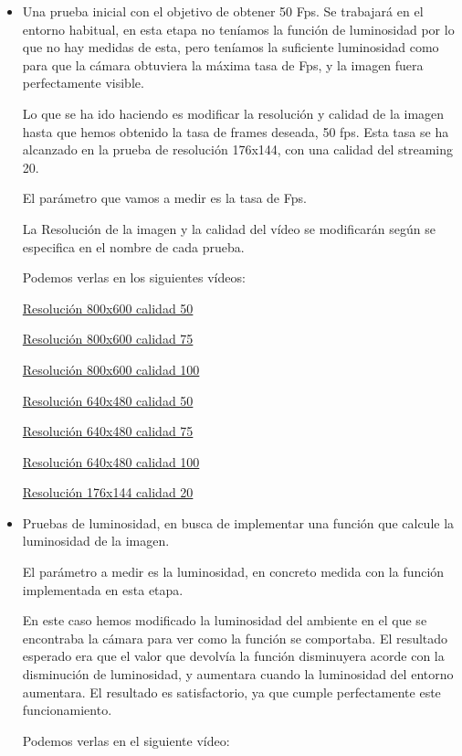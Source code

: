 \begin{itemize}
	\item Una prueba inicial con el objetivo de obtener 50 Fps. Se trabajará en el entorno habitual, en esta etapa no teníamos la función de luminosidad por lo que no hay medidas de esta, pero teníamos la suficiente luminosidad como para que la cámara obtuviera la máxima tasa de Fps, y la imagen fuera perfectamente visible.
	
Lo que se ha ido haciendo es modificar la resolución y calidad de la imagen hasta que hemos obtenido la tasa de frames deseada, 50 fps. Esta tasa se ha alcanzado en la prueba de resolución 176x144, con una calidad del streaming 20.

El parámetro que vamos a medir es la tasa de Fps.

La Resolución de la imagen y la calidad del vídeo se modificarán según se especifica en el nombre de cada prueba. 

Podemos verlas en los siguientes vídeos:
	
	\href{https://youtu.be/r73s9I_8SiI}{Resolución 800x600 calidad 50}
	
	\href{https://youtu.be/rdv0COnl-G4}{Resolución 800x600 calidad 75}
	
	\href{https://youtu.be/tGip7sWjD8E}{Resolución 800x600 calidad 100}
	
	\href{https://youtu.be/saFDDQNjsEs}{Resolución 640x480 calidad 50}
	
	\href{https://youtu.be/a3ZxLQB37k0}{Resolución 640x480 calidad 75}
	
	\href{https://youtu.be/zu8rWr31fuQ}{Resolución 640x480 calidad 100}
	
	\href{https://youtu.be/WzJjXKeKpaI}{Resolución 176x144 calidad 20}	
	
	\item Pruebas de luminosidad, en busca de implementar una función que calcule la luminosidad de la imagen. 

El parámetro a medir es la luminosidad, en concreto medida con la
función implementada en esta etapa.

En este caso hemos modificado la luminosidad del ambiente en el que se encontraba la cámara para ver como la función se comportaba. El resultado esperado era que el valor que devolvía la función disminuyera acorde con la disminución de luminosidad, y aumentara cuando la luminosidad del entorno aumentara. El resultado es satisfactorio, ya que cumple perfectamente este funcionamiento.
	
	Podemos verlas en el siguiente vídeo:
	

\end{itemize}
